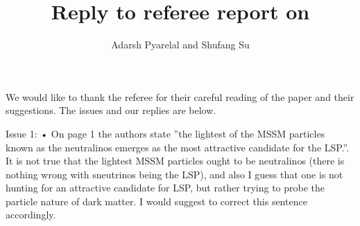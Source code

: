 \documentclass{article}
\title{Reply to referee report on \verbatim{JHEP_111P_0819}}
\author{Adarsh Pyarelal and Shufang Su}
\begin{document}
\maketitle

We would like to thank the referee for their careful reading of the paper and their 
suggestions. The issues and our replies are below.

Issue 1: • On page 1 the authors state ”the lightest of the MSSM particles known as the neutralinos emerges as the most attractive candidate for the LSP.”. It is not true that the lightest MSSM particles ought to be neutralinos (there is nothing wrong with sneutrinos being the LSP), and also I guess that one is not hunting for an attractive candidate for LSP, but rather trying to probe the particle nature of dark matter. I would suggest to correct this sentence accordingly.
\end{document}
